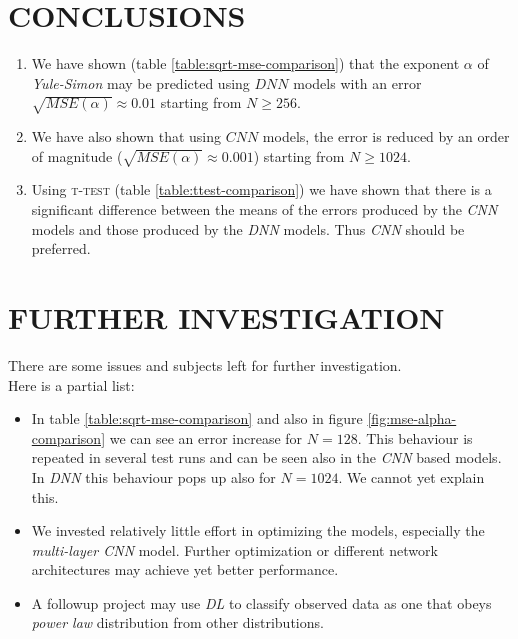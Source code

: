 \documentclass[a4paper, 12pt]{report}
\begin{document}
\section{CONCLUSIONS}

\begin{enumerate}
\small
    \item We have shown (table \ref{table:sqrt-mse-comparison}) that the exponent $\alpha$ of \textit{Yule-Simon} may be predicted using $DNN$ models with an error $\sqrt{MSE(\alpha)} \approx 0.01$ starting from $N \geq 256$.
    
    \item We have also shown that using $CNN$ models, the error is reduced by an order of magnitude ($\sqrt{MSE(\alpha)} \approx 0.001$) starting from $N \geq 1024$.
    
    \item Using \textsc{t-test} (table \ref{table:ttest-comparison}) we have shown that there is a significant difference between the means of the errors produced by the \textit{CNN} models and those produced by the \textit{DNN} models. Thus \textit{CNN} should be preferred.
\end{enumerate}

\section{FURTHER INVESTIGATION}
There are some issues and subjects left for further investigation. \\
Here is a partial list:

\begin{itemize}
\small
    \item In table \ref{table:sqrt-mse-comparison} and also in figure \ref{fig:mse-alpha-comparison} we can see an error increase for $N=128$. This behaviour is repeated in several test runs and can be seen also in the \textit{CNN} based models. In \textit{DNN} this behaviour pops up also for $N=1024$. We cannot yet explain this.
    
    \item We invested relatively little effort in optimizing the models, especially the \textit{multi-layer CNN} model. Further optimization or different network architectures may achieve yet better performance.
    
    \item A followup project may use \textit{DL} to classify observed data as one that obeys \textit{power law} distribution from other distributions.
\end{itemize}

\printbibliography
\end{document}
